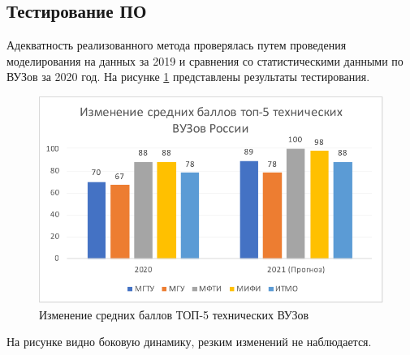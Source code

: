 \subsection{Тестирование ПО}

Адекватность реализованного метода проверялась путем проведения моделирования на данных за 2019 и сравнения со статистическими данными по ВУЗов за 2020 год. На рисунке \ref{top5tech} представлены результаты тестирования.

\begin{figure}[hbtp]
	\centering
	\includegraphics[scale=1.1]{img/top5tech.pdf.pdf}
	\caption{Изменение средних баллов ТОП-5 технических ВУЗов}
	\label{top5tech}
\end{figure} 

На рисунке видно боковую динамику, резким изменений не наблюдается.

\pagebreak
